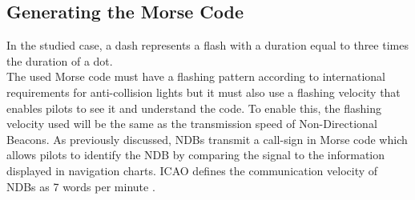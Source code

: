 \subsection{Generating the Morse Code}
\label{subsection:generatemorse}
In the studied case, a dash represents a flash with a duration equal to three times the duration of a dot.\\
The used Morse code must have a flashing pattern according to international requirements for anti-collision lights but it must also use a flashing velocity that enables pilots to see it and understand the code. To enable this, the flashing velocity used will be the same as the transmission speed of Non-Directional Beacons. As previously discussed, NDBs transmit a call-sign in Morse code which allows pilots to identify the NDB by comparing the signal to the information displayed in navigation charts. ICAO defines the communication velocity of NDBs as 7 words per minute \citep{InternationalCivilAviationOrganization2006}.\\

